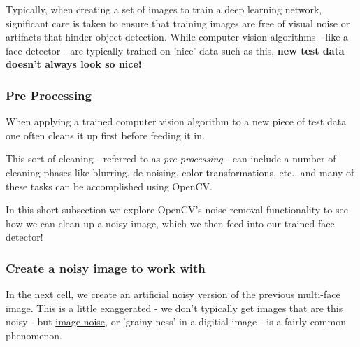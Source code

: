 \documentclass[11pt]{article}
\begin{document}
Typically, when creating a set of images to train a deep learning
network, significant care is taken to ensure that training images are
free of visual noise or artifacts that hinder object detection. While
computer vision algorithms - like a face detector - are typically
trained on 'nice' data such as this, \textbf{new test data doesn't
always look so nice!}

\subsubsection{Pre Processing}\label{pre-processing}

When applying a trained computer vision algorithm to a new piece of test
data one often cleans it up first before feeding it in.

This sort of cleaning - referred to as \emph{pre-processing} - can
include a number of cleaning phases like blurring, de-noising, color
transformations, etc., and many of these tasks can be accomplished using
OpenCV.

In this short subsection we explore OpenCV's noise-removal functionality
to see how we can clean up a noisy image, which we then feed into our
trained face detector!

    \subsubsection{Create a noisy image to work
with}\label{create-a-noisy-image-to-work-with}

In the next cell, we create an artificial noisy version of the previous
multi-face image. This is a little exaggerated - we don't typically get
images that are this noisy - but
\href{https://digital-photography-school.com/how-to-avoid-and-reduce-noise-in-your-images/}{image
noise}, or 'grainy-ness' in a digitial image - is a fairly common
phenomenon.
\end{document}
